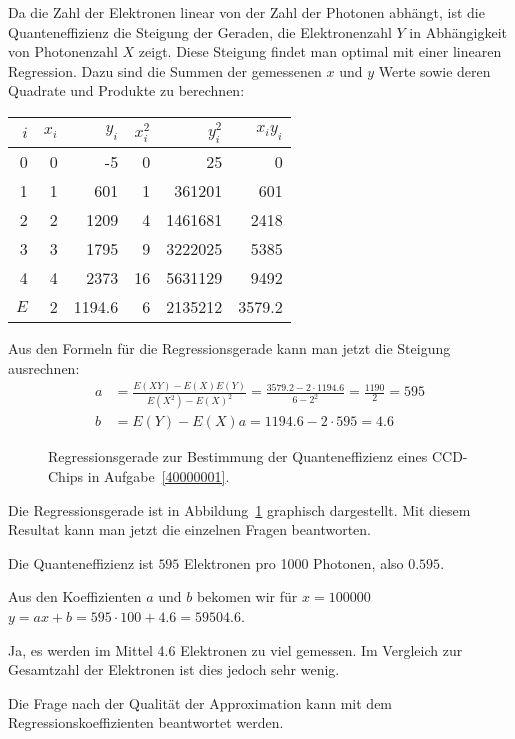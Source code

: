 \begin{loesung}
Da die Zahl der Elektronen linear von der Zahl der Photonen abhängt,
ist die Quanteneffizienz die Steigung der Geraden, die Elektronenzahl $Y$
in Abhängigkeit von Photonenzahl $X$ zeigt. Diese Steigung findet man
optimal mit einer linearen Regression. Dazu sind die Summen der gemessenen
$x$ und $y$ Werte sowie deren Quadrate und Produkte zu berechnen:
\begin{center}
\begin{tabular}{|r|rr|rr|r|}
\hline
$i$&$x_i$&$y_i$&$x_i^2$&$y_i^2$&$x_iy_i$\\
\hline
0&0&   -5&  0&     25&    0\\
1&1&  601&  1& 361201&  601\\
2&2& 1209&  4&1461681& 2418\\
3&3& 1795&  9&3222025& 5385\\
4&4& 2373& 16&5631129& 9492\\
\hline
$E$&2& 1194.6&6&2135212&3579.2\\
\hline
\end{tabular}
\end{center}
Aus den Formeln für die Regressionsgerade kann man jetzt die
Steigung ausrechnen:
\begin{align*}
a&=\frac{E(XY)-E(X)E(Y)}{E(X^2)-E(X)^2}=
\frac{3579.2-2 \cdot 1194.6}{6-2^2}=\frac{1190}{2}=595
\\
b&=E(Y)-E(X)a=1194.6-2 \cdot 595=4.6
\end{align*}
\begin{figure}
\centering
{}
\caption{Regressionsgerade zur Bestimmung der Quanteneffizienz eines CCD-Chips
in Aufgabe~\ref{40000001}.
\label{40000001:graphik}}
\end{figure}
Die Regressionsgerade ist in Abbildung~\ref{40000001:graphik} graphisch
dargestellt.
Mit diesem Resultat kann man jetzt die einzelnen Fragen beantworten.
\begin{teilaufgaben}
\item Die Quanteneffizienz ist $595$ Elektronen pro 1000 Photonen, also
$0.595$.
\item
Aus den Koeffizienten $a$ und $b$ bekomen wir für $x=100000$
$y=ax+b=595\cdot 100+4.6=59504.6$.
\item
Ja, es werden im Mittel 4.6 Elektronen zu viel gemessen. Im Vergleich
zur Gesamtzahl der Elektronen ist dies jedoch sehr wenig.
\item
Die Frage nach der Qualität der Approximation kann mit dem
Regressionskoeffizienten beantwortet werden.

\end{teilaufgaben}
\end{loesung}
